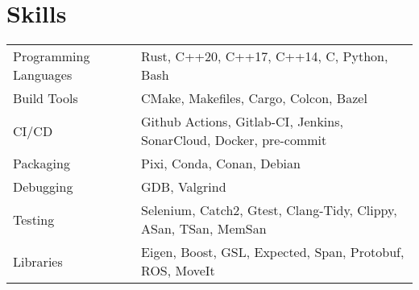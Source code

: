 \documentclass[a4paper,12pt]{article}
\begin{document}
\section{Skills}
\begin{tabularx}{\linewidth}{@{}l X@{}}
Programming Languages &  \normalsize{Rust, C++20, C++17, C++14, C, Python, Bash}\\
Build Tools &  \normalsize{CMake, Makefiles, Cargo, Colcon, Bazel}\\
CI\slash CD  &  \normalsize{Github Actions, Gitlab-CI, Jenkins, SonarCloud, Docker, pre-commit}\\
Packaging  &  \normalsize{Pixi, Conda, Conan, Debian}\\
Debugging  &  \normalsize{GDB, Valgrind}\\
Testing  &  \normalsize{Selenium, Catch2, Gtest, Clang-Tidy, Clippy, ASan, TSan, MemSan}\\
Libraries  &  \normalsize{Eigen, Boost, GSL, Expected, Span, Protobuf, ROS, MoveIt}\\
\end{tabularx}
\end{document}
